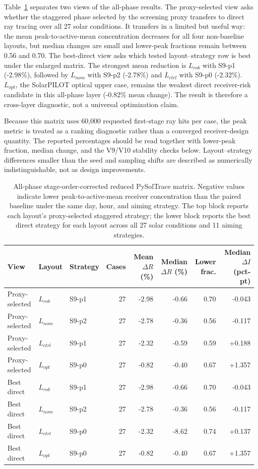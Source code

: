 \documentclass[final,3p,times]{elsarticle}
\begin{document}
Table~\ref{tab:soltrace-corrected} separates two views of the all-phase results. The proxy-selected view asks whether the staggered phase selected by the screening proxy transfers to direct ray tracing over all 27 solar conditions. It transfers in a limited but useful way: the mean peak-to-active-mean concentration decreases for all four non-baseline layouts, but median changes are small and lower-peak fractions remain between 0.56 and 0.70. The best-direct view asks which tested layout--strategy row is best under the enlarged matrix. The strongest mean reduction is $L_{rob}$ with S9-p1 (-2.98\%), followed by $L_{nom}$ with S9-p2 (-2.78\%) and $L_{ctrl}$ with S9-p0 (-2.32\%). $L_{opt}$, the SolarPILOT optical upper case, remains the weakest direct receiver-risk candidate in this all-phase layer (-0.82\% mean change). The result is therefore a cross-layer diagnostic, not a universal optimization claim.

Because this matrix uses 60,000 requested first-stage ray hits per case, the peak metric is treated as a ranking diagnostic rather than a converged receiver-design quantity. The reported percentages should be read together with lower-peak fraction, median change, and the V9/V10 stability checks below. Layout--strategy differences smaller than the seed and sampling shifts are described as numerically indistinguishable, not as design improvements.

\begin{table}[H]
\centering
\caption{All-phase stage-order-corrected reduced PySolTrace matrix. Negative values indicate lower peak-to-active-mean receiver concentration than the paired baseline under the same day, hour, and aiming strategy. The top block reports each layout's proxy-selected staggered strategy; the lower block reports the best direct strategy for each layout across all 27 solar conditions and 11 aiming strategies.}
\label{tab:soltrace-corrected}
\tiny
\begin{tabular*}{\textwidth}{@{\extracolsep{\fill}}lllrrrrr@{}}
\toprule
View & Layout & Strategy & Cases & Mean $\Delta R$ (\%) & Median $\Delta R$ (\%) & Lower frac. & Median $\Delta I$ (pct-pt) \\
\midrule
Proxy-selected & $L_{rob}$ & S9-p1 & 27 & -2.98 & -0.66 & 0.70 & -0.043 \\
Proxy-selected & $L_{nom}$ & S9-p2 & 27 & -2.78 & -0.36 & 0.56 & -0.117 \\
Proxy-selected & $L_{ctrl}$ & S9-p1 & 27 & -2.32 & -0.59 & 0.59 & +0.188 \\
Proxy-selected & $L_{opt}$ & S9-p0 & 27 & -0.82 & -0.40 & 0.67 & +1.357 \\
\midrule
Best direct & $L_{rob}$ & S9-p1 & 27 & -2.98 & -0.66 & 0.70 & -0.043 \\
Best direct & $L_{nom}$ & S9-p2 & 27 & -2.78 & -0.36 & 0.56 & -0.117 \\
Best direct & $L_{ctrl}$ & S9-p0 & 27 & -2.32 & -8.62 & 0.74 & +0.137 \\
Best direct & $L_{opt}$ & S9-p0 & 27 & -0.82 & -0.40 & 0.67 & +1.357 \\
\bottomrule
\end{tabular*}
\end{table}
\end{document}
